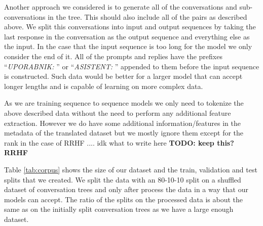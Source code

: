 \documentclass[fleqn,moreauthors,10pt]{ds_report}
\begin{document}
    Another approach we considered is to generate all of the conversations and sub-conversations in the tree.
    This should also include all of the pairs as described above.
    We split this conversations into input and output sequences by taking the last response in the conversation as the output sequence and everything else as the input.
    In the case that the input sequence is too long for the model we only consider the end of it.
    All of the prompts and replies have the prefixes ``\textit{UPORABNIK: }'' or ``\textit{ASISTENT: }'' appended to them before the input sequence is constructed.
    Such data would be better for a larger model that can accept longer lengths and is capable of learning on more complex data.

    As we are training sequence to sequence models we only need to tokenize the above described data without the need to perform any additional feature extraction.
    However we do have some additional information/features in the metadata of the translated dataset but we mostly ignore them except for the rank in the case of RRHF .... idk what to write here
    \textbf{TODO: keep this? RRHF}


    Table \ref{tab:corpus} shows the size of our dataset and the train, validation and test splits that we created.
    We split the data with an 80-10-10 split on a shuffled dataset of conversation trees and only after process the data in a way that our models can accept.
    The ratio of the splits on the processed data is about the same as on the initially split conversation trees as we have a large enough dataset.
    

    \begin{table}[!h]
        \centering
       \caption{\textbf{Corpus Description}: TODO decribe table and reference in text}
       \label{tab:corpus}
    \end{table}
\end{document}
